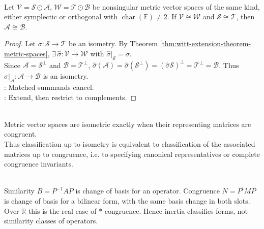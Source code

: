 \begin{corollary} \label{cor:witt-cancellation-metric-spaces} \\
Let $\mathcal{V}=\mathcal{S}\odot\mathcal{A}$, $\mathcal{W}=\mathcal{T}\odot\mathcal{B}$ be nonsingular metric vector spaces of the same kind, either symplectic or orthogonal with $\operatorname{char}(\mathbb{F})\neq2$. If $\mathcal{V}\cong\mathcal{W}$ and $\mathcal{S}\cong\mathcal{T}$, then $\mathcal{A}\cong\mathcal{B}$.
\begin{proof}
Let $\sigma:\mathcal{S}\to\mathcal{T}$ be an isometry. By Theorem \ref{thm:witt-extension-theorem-metric-spaces}, $\exists\,\widehat{\sigma}:\mathcal{V}\to\mathcal{W}$ with $\widehat{\sigma}|_{\mathcal{S}}=\sigma$.\\
Since $\mathcal{A}=\mathcal{S}^{\perp}$ and $\mathcal{B}=\mathcal{T}^{\perp}$, $\widehat{\sigma}(\mathcal{A}) =\widehat{\sigma}(\mathcal{S}^{\perp}) =(\widehat{\sigma}\mathcal{S})^{\perp} =\mathcal{T}^{\perp} =\mathcal{B}$. Thus $\widehat{\sigma}|_{\mathcal{A}}:\mathcal{A}\to\mathcal{B}$ is an isometry.\\
: Matched summands cancel.\\
: Extend, then restrict to complements.
\end{proof}
\end{corollary}

\begin{perspective} \label{per:classification-by-congruence} \\
Metric vector spaces are isometric exactly when their representing matrices are congruent.\\
Thus classification up to isometry is equivalent to classification of the associated matrices up to congruence, i.e. to specifying canonical representatives or complete congruence invariants.
\end{perspective}

\begin{perspective} \label{per:ordinary-congruence-bilinear-form-bridge} \\
Similarity $B=P^{-1}AP$ is change of basis for an operator. Congruence $N=P^tMP$ is change of basis for a bilinear form, with the same basis change in both slots. Over $\mathbb{R}$ this is the real case of $*$-congruence. Hence inertia classifies forms, not similarity classes of operators.
\end{perspective}
